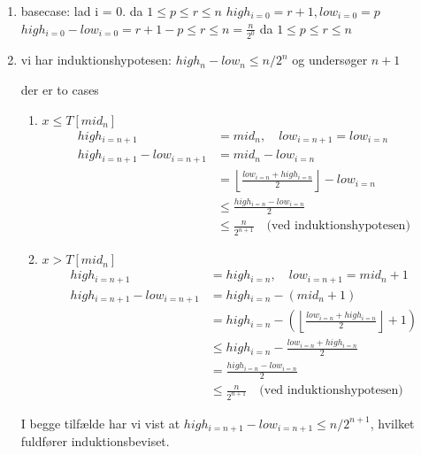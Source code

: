 \documentclass{article}
\theoremstyle{definition}
\begin{document}
\begin{enumerate}
    \item basecase:
    lad i = 0.
    da $1 \leq p \leq r \leq n$
    $high_{i=0} = r+1, low_{i=0} = p$ 
    $high_{i=0} - low_{i=0} = r+1 - p \leq r \leq n = \frac{n}{2^0}$ da $1 \leq p \leq r \leq n$
    \item 
    vi har induktionshypotesen: $high_n - low_n \leq n/2^n$ og undersøger $n+1$

    der er to cases
    \begin{enumerate}
        \item $x \leq T[mid_{n}]$
        \begin{align*}
            high_{i=n+1} &= mid_{n}, \quad low_{i=n+1}=low_{i=n} \\
            high_{i=n+1} - low_{i=n+1} &= mid_{n} - low_{i=n} \\
            &= \left\lfloor\frac{low_{i=n} + high_{i=n}}{2}\right\rfloor - low_{i=n} \\
            &\leq \frac{high_{i=n} - low_{i=n}}{2} \\
            &\leq \frac{n}{2^{n+1}} \quad \text{(ved induktionshypotesen)}
        \end{align*}

        \item $x > T[mid_{n}]$
        \begin{align*}
            high_{i=n+1} &= high_{i=n}, \quad low_{i=n+1}=mid_{n}+1 \\
            high_{i=n+1} - low_{i=n+1} &= high_{i=n} - (mid_{n}+1) \\
            &= high_{i=n} - \left(\left\lfloor\frac{low_{i=n} + high_{i=n}}{2}\right\rfloor+1\right) \\
            &\leq high_{i=n} - \frac{low_{i=n} + high_{i=n}}{2} \\
            &= \frac{high_{i=n} - low_{i=n}}{2} \\
            &\leq \frac{n}{2^{n+1}} \quad \text{(ved induktionshypotesen)}
        \end{align*}
    \end{enumerate}

    I begge tilfælde har vi vist at $high_{i=n+1} - low_{i=n+1} \leq n/2^{n+1}$, hvilket fuldfører induktionsbeviset.
\end{enumerate}
\end{document}

